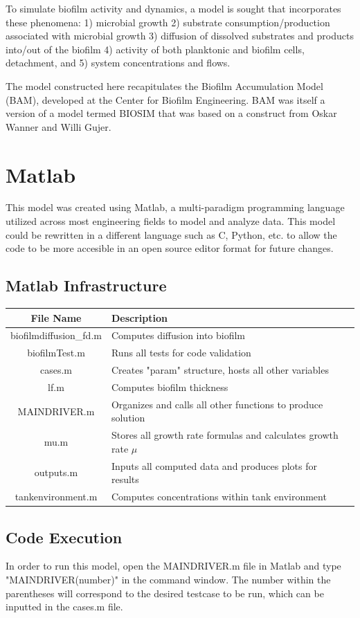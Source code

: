 \documentclass[letterpaper, twoside]{article}
\numberwithin{equation}{section}
\begin{document}
To simulate biofilm activity and dynamics, a model is sought that incorporates these phenomena: 1) microbial growth 2) substrate consumption/production associated with microbial growth 3) diffusion of dissolved substrates and products into/out of the biofilm 4) activity of both planktonic and biofilm cells, detachment, and 5) system concentrations and flows.

The model constructed here recapitulates the Biofilm Accumulation Model (BAM), developed at the Center for Biofilm Engineering. BAM was itself a version of a model termed BIOSIM that was based on a construct from Oskar Wanner and Willi Gujer.

\section{Matlab}
This model was created using Matlab, a multi-paradigm programming language utilized across most engineering fields to model and analyze data. This model could be rewritten in a different language such as C, Python, etc. to allow the code to be more accesible in an open source editor format for future changes. 

\subsection{Matlab Infrastructure}
\begin{tabular}{c l c}
  File Name & Description \\ \hline
  biofilmdiffusion\_fd.m & Computes diffusion into biofilm \\
  biofilmTest.m & Runs all tests for code validation \\
  cases.m & Creates "param" structure, hosts all other variables \\
  lf.m & Computes biofilm thickness \\
  MAINDRIVER.m & Organizes and calls all other functions to produce solution \\
  mu.m & Stores all growth rate formulas and calculates growth rate $\mu$ \\
  outputs.m & Inputs all computed data and produces plots for results \\
  tankenvironment.m & Computes concentrations within tank environment \\
\end{tabular}

\subsection{Code Execution}
In order to run this model, open the MAINDRIVER.m file in Matlab and type "MAINDRIVER(number)" in the command window. The number within the parentheses will correspond to the desired testcase to be run, which can be inputted in the cases.m file. 
  
\end{document}
